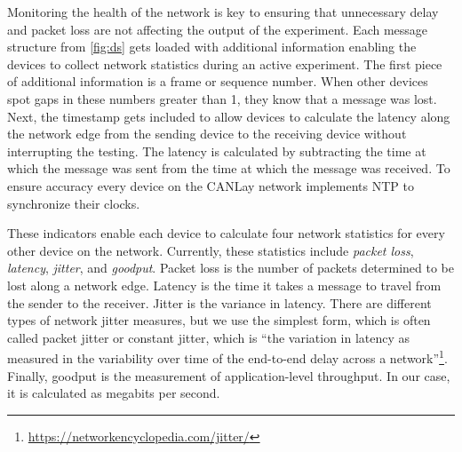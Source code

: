 \documentclass[letterpaper,twocolumn,12pt]{article}
\begin{document}
Monitoring the health of the network is key to ensuring that unnecessary delay and packet loss are not affecting the output of the experiment. 
Each message structure from \ref{fig:ds} gets loaded with additional information enabling the devices to collect network statistics during an active experiment. 
The first piece of additional information is a frame or sequence number. When other devices spot gaps in these numbers greater than 1, they know that a message was lost.
Next, the timestamp gets included to allow devices to calculate the latency along the network edge from the sending device to the receiving device without interrupting the testing.
The latency is calculated by subtracting the time at which the message was sent from the time at which the message was received. To ensure accuracy every device on the CANLay network implements NTP to synchronize their clocks.

These indicators enable each device to calculate four network statistics for every other device on the network. Currently, these statistics include \emph{packet loss}, \emph{latency}, \emph{jitter}, and \emph{goodput}. Packet loss is the number of packets determined to be lost along a network edge. Latency is the time it takes a message to travel from the sender to the receiver. Jitter is the variance in latency. There are different types of network jitter measures, but we use the simplest form, which is often called packet jitter or constant jitter, which is “the variation in latency as measured in the variability over time of the end-to-end delay across a network”\footnote{\url{https://networkencyclopedia.com/jitter/}}. Finally, goodput is the measurement of application-level throughput. In our case, it is calculated as megabits per second.
\end{document}
